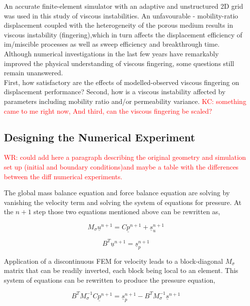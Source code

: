 \documentclass[preprint,authoryear,12pt]{elsarticle}
\begin{document}
An accurate finite-element simulator with an adaptive and unstructured 2D grid was used in this study of viscous 
instabilities. An unfavourable - mobility-ratio displacement coupled with the heterogeneity of the porous medium results in viscous instability (fingering),which in turn affects the displacement efficiency of im/miscible processes as well as sweep efficiency and breakthrough time. Although numerical investigations 
in the last few years have remarkably improved the physical 
understanding of viscous fingering, some questions still remain 
unanswered.\\
 
First, how satisfactory are the effects of modelled-observed viscous fingering on displacement performance? Second, how 
is a viscous instability affected by parameters including mobility 
ratio and/or permeability variance. \textcolor{red}{ KC: something came to me right now, And third, can the viscous fingering be scaled?}  

\subsection{Designing the Numerical Experiment}\label{section:NumericalExperiment}
\textcolor{red}{WR: could add here a paragraph describing the original geometry and simulation set up (initial and boundary conditions)and maybe a table with the differences between the diff numerical experiments.}

The global mass balance equation and force balance equation are solving by vanishing the velocity term and solving the system of equations for pressure. At the $n+1$ step those two equations mentioned above can be rewritten as, 

\begin{equation}
M_{\sigma} {{\underline{u}}^{n+1}} = C {\underline{p}^{n+1}} + {\underline{s}_u ^{n+1}}
\label{mass balance eq}
\end{equation}

\begin{equation}
B^T {{\underline{u}}^{n+1}} = {\underline{s}_p ^{n+1}}
\label{force balance eq}
\end{equation}

\noindent Application of a discontinuous FEM for velocity leads to a block-diagonal $M_{\sigma}$ matrix that can be readily inverted, each block being local to an element. This system of equations can be rewritten to produce the pressure equation, 

\begin{equation}
B^T M_{\sigma} ^{-1} C{{\underline{p}}^{n+1}} = {\underline{s}_p ^{n+1}} - B^T M_{\sigma} ^{-1} {{\underline{s}}^{n+1}} 
\label{pressure eq}
\end{equation}
\end{document}
